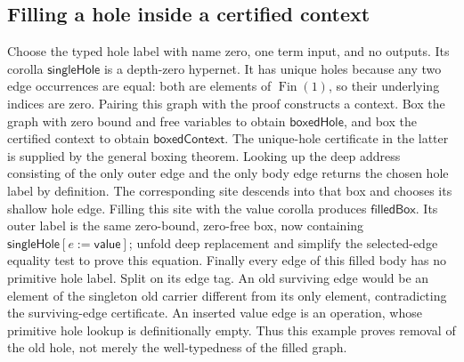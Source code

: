 \subsection{Filling a hole inside a certified context}
Choose the typed hole label with name zero, one term input, and no outputs.
Its corolla $\mathsf{singleHole}$ is a depth-zero hypernet. It has unique holes
because any two edge occurrences are equal: both are elements of
$\operatorname{Fin}(1)$, so their underlying indices are zero. Pairing this graph
with the proof constructs a context.
Box the graph with zero bound and free variables to obtain $\mathsf{boxedHole}$,
and box the certified context to obtain $\mathsf{boxedContext}$. The unique-hole
certificate in the latter is supplied by the general boxing theorem. Looking
up the deep address consisting of the only outer edge and the only body edge
returns the chosen hole label by definition.
The corresponding site descends into that box and chooses its shallow hole edge.
Filling this site with the value corolla produces $\mathsf{filledBox}$. Its outer
label is the same zero-bound, zero-free box, now containing
$\mathsf{singleHole}[e:=\mathsf{value}]$; unfold deep replacement and simplify the
selected-edge equality test to prove this equation.
Finally every edge of this filled body has no primitive hole label. Split on
its edge tag. An old surviving edge would be an element of the singleton old
carrier different from its only element, contradicting the surviving-edge
certificate. An inserted value edge is an operation, whose primitive hole lookup
is definitionally empty. Thus this example proves removal of the old hole, not
merely the well-typedness of the filled graph.

